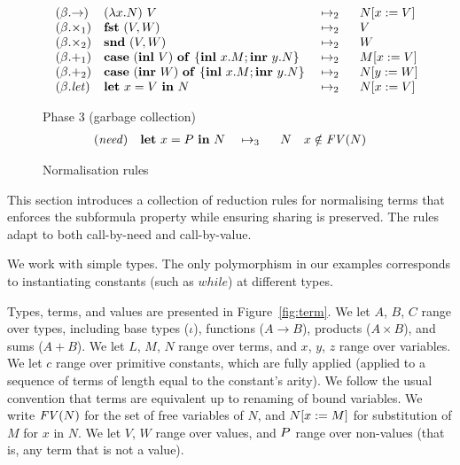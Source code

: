 {\begin{figure*}[t]
\[\begin{array}[t]{@{\quad}llll@{}}
(\beta.{\rightarrow})
& \expapp{(\expabs{x}{A}{N})}{V}
& \ \rewrite{}{2}{}\ \
& \sbs{N}{x}{V} \\

(\beta.{\times_1})
& \expfst{\expprd{V}{W}}
& \ \rewrite{}{2}{}\ \
& V \\

(\beta.{\times_2})
& \expsnd{\expprd{V}{W}}
& \ \rewrite{}{2}{}\ \
& W \\

(\beta.{+_1})
& \expcas{(\explft{V}{B})}{x}{M}{y}{N}
& \ \rewrite{}{2}{}\ \
& \sbs{M}{x}{V} \\

(\beta.{+_2})
& \expcas{(\exprgt{A}{W})}{x}{M}{y}{N}
& \ \rewrite{}{2}{}\ \
& \sbs{N}{y}{W} \\

(\beta.{\txt{let}})
& \expshr{x}{V}{N}
& \ \rewrite{}{2}{}\ \
& \sbs{N}{x}{V} \\
\end{array}
\]

\vspace{2ex}

Phase 3 (garbage collection)
\[
\begin{array}[t]{@{}llll@{\quad}l@{}}

(\txt{need})
& \expshr{x}{\nv}{N}
& \ \rewrite{}{3}{}\ \
& N %
& \cnd{%
       x \notin \fv{N}}\\
\end{array}
\]
\caption{Normalisation rules}
\label{fig:norm}
\end{figure*}
}



This section introduces a collection of reduction rules for
normalising terms that enforces the subformula property 
while ensuring sharing is preserved. The rules adapt to
both call-by-need and call-by-value.

We work with simple types. The only polymorphism in our examples
corresponds to instantiating constants (such as $\mathit{while}$) at
different types.

Types, terms, and values are presented in Figure~\ref{fig:term}. We
let $A$, $B$, $C$ range over types, including base types ($\iota$),
functions ($A \to B$), products ($A \times B$), and sums ($A + B$).
We let $L$, $M$, $N$ range over terms, and $x$, $y$, $z$ range over
variables.  We let $c$ range over primitive constants, which are
fully applied (applied to a sequence of terms of length equal to
the constant's arity).
We follow the usual convention that terms are equivalent up
to renaming of bound variables. We write $\text{\textit{FV}}(N)$ for the set of free
variables of $N$, and $N[x:=M]$ for substitution of $M$ for $x$
in $N$.
%
%
We let $V$, $W$ range over values, and $P$ range over non-values
(that is, any term that is not a value).

